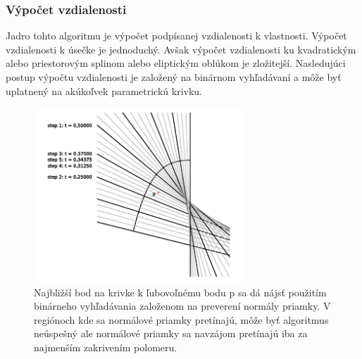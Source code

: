 \subsubsection{Výpočet vzdialenosti}

Jadro tohto algoritmu je výpočet podpísanej vzdialenosti k vlastnosti. Výpočet vzdialenosti k úsečke je jednoduchý. Avšak výpočet vzdialenosti ku kvadratickým alebo priestorovým splinom alebo eliptickým oblúkom je zložitejší. Nasledujúci postup výpočtu vzdialenosti je založený na binárnom vyhľadávaní a môže byť uplatnený na akúkoľvek parametrickú krivku.
\begin{figure}[H]
\begin{center}
\includegraphics[width=0.7\textwidth]{images/distance_computation_1}
\caption{Najbližší bod na krivke k ľubovoľnému bodu p sa dá nájsť použitím binárneho vyhľadávania založenom na preverení normály priamky. V regiónoch kde sa normálové priamky pretínajú, môže byť algoritmus neúspešný ale normálové priamky sa navzájom pretínajú iba za najmenším zakrivením polomeru. \cite{qmk08}}
\label{img:distance_computation_1}
\end{center}
\end{figure}

